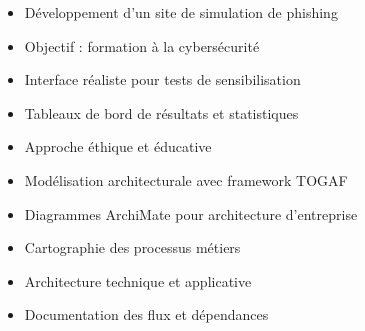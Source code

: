 \documentclass[10pt,a4paper,normalphoto]{altacv}
\begin{document}
\begin{itemize}
\item Développement d'un site de simulation de phishing
\item Objectif : formation à la cybersécurité
\item Interface réaliste pour tests de sensibilisation
\item Tableaux de bord de résultats et statistiques
\item Approche éthique et éducative
\end{itemize}

\divider

\begin{itemize}
\item Modélisation architecturale avec framework TOGAF
\item Diagrammes ArchiMate pour architecture d'entreprise
\item Cartographie des processus métiers
\item Architecture technique et applicative
\item Documentation des flux et dépendances
\end{itemize}
\end{document}
